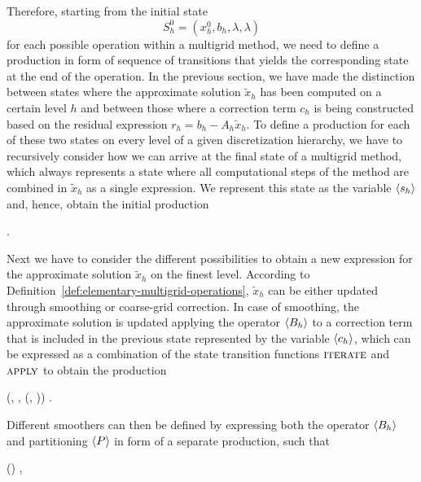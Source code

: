 Therefore, starting from the initial state 
\begin{equation*}
	S^0_h = (x_h^0, b_h, \lambda, \lambda)
\end{equation*}
for each possible operation within a multigrid method, we need to define a production in form of sequence of transitions that yields the corresponding state at the end of the operation.
In the previous section, we have made the distinction between states where the approximate solution $\tilde{x}_h$ has been computed on a certain level $h$ and between those where a correction term $c_h$ is being constructed based on the residual expression $r_h = b_h - A_h \tilde{x}_h$.
To define a production for each of these two states on every level of a given discretization hierarchy, we have to recursively consider how we can arrive at the final state of a multigrid method, which always represents a state where all computational steps of the method are combined in $\tilde{x}_h$ as a single expression.
We represent this state as the variable $\langle s_h \rangle$ and, hence, obtain the initial production
\begin{bnf}
	 {
	}.
\end{bnf}
Next we have to consider the different possibilities to obtain a new expression for the approximate solution $\tilde{x}_{h}$ on the finest level.
According to Definition~\ref{def:elementary-multigrid-operations}, $\tilde{x}_{h}$ can be either updated through smoothing or coarse-grid correction.
In case of smoothing, the approximate solution is updated applying the operator $\langle B_h \rangle$ to a correction term that is included in the previous state represented by the variable $\langle c_h \rangle$, which can be expressed as a combination of the state transition functions $\textsc{iterate}$ and $\textsc{apply}$ to obtain the production
\begin{bnf}
	 {
		(\bnfts{$\omega$}, \bnfsp {}, \bnfsp {}(, \bnfsp {}))
	}.
\label{prod:smoothing}
\end{bnf}
Different smoothers can then be defined by expressing both the operator $\langle B_h \rangle$ and partitioning $\langle P \rangle$ in form of a separate production, such that
\begin{bnf}
	 {
		() \bnfsp {} \bnfsp {}
	},
\label{prod:smoothing-operator}
\end{bnf}
